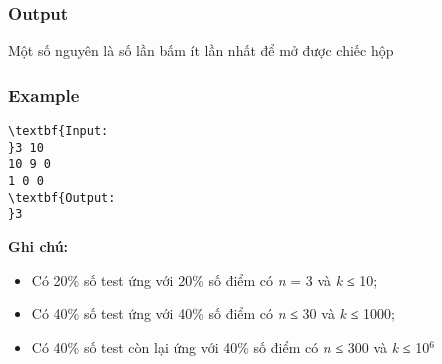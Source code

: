 \subsubsection{Output}

Một số nguyên là số lần bấm ít lần nhất để mở được chiếc hộp

\subsubsection{Example}
\begin{verbatim}
\textbf{Input:
}3 10
10 9 0
1 0 0
\textbf{Output:
}3
\end{verbatim}

\textbf{\textbf{Ghi chú:}}
\begin{itemize}
	\item Có 20\% số test ứng với 20\% số điểm có \emph{n }= 3 và \emph{k} ≤ 10;
	\item Có 40\% số test ứng với 40\% số điểm có \emph{n }≤ 30 và \emph{k} ≤ 1000;
	\item Có 40\% số test còn lại ứng với 40\% số điểm có \emph{n }≤ 300 và \emph{k} ≤ 10$^6$
\end{itemize}